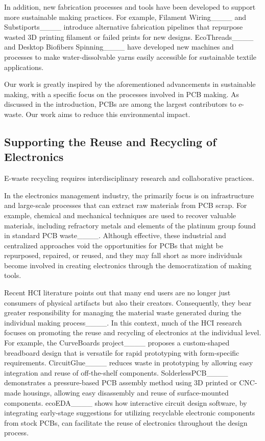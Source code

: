 In addition, new fabrication processes and tools have been developed to support more sustainable making practices. 
For example, Filament Wiring____ and Substiports____ introduce alternative fabrication pipelines that repurpose wasted 3D printing filament or failed prints for new designs. EcoThreads____ and Desktop Biofibers Spinning____ have developed new machines and processes to make water-dissolvable yarns easily accessible for sustainable textile applications. 

Our work is greatly inspired by the aforementioned advancements in sustainable making, with a specific focus on the processes involved in PCB making. As discussed in the introduction, PCBs are among the largest contributors to e-waste. Our work aims to reduce this environmental impact.















\subsection{Supporting the Reuse and Recycling of Electronics}
E-waste recycling requires interdisciplinary research and collaborative practices.

In the electronics management industry, the primarily focus is on infrastructure and large-scale processes that can extract raw materials from PCB scrap. 
For example, chemical and mechanical techniques are used to recover valuable materials, including refractory metals and elements of the platinum group found in standard PCB waste____. 
Although effective, these industrial and centralized approaches void the opportunities for PCBs that might be repurposed, repaired, or reused, and they may fall short as more individuals become involved in creating electronics through the democratization of making tools. 

Recent HCI literature points out that many end users are no longer just consumers of physical artifacts but also their creators. 
Consequently, they bear greater responsibility for managing the material waste generated during the individual making process____. 
In this context, much of the HCI research focuses on promoting the reuse and recycling of electronics at the individual level. For example, the CurveBoards project____ proposes a custom-shaped breadboard design that is versatile for rapid prototyping with form-specific requirements. 
CircuitGlue____ reduces waste in prototyping by allowing easy integration and reuse of off-the-shelf components.
SolderlessPCB____ demonstrates a pressure-based PCB assembly method using 3D printed or CNC-made housings, allowing easy disassembly and reuse of surface-mounted components.
ecoEDA____ shows how interactive circuit design software, by integrating early-stage suggestions for utilizing recyclable electronic components from stock PCBs, can facilitate the reuse of electronics throughout the design process.


